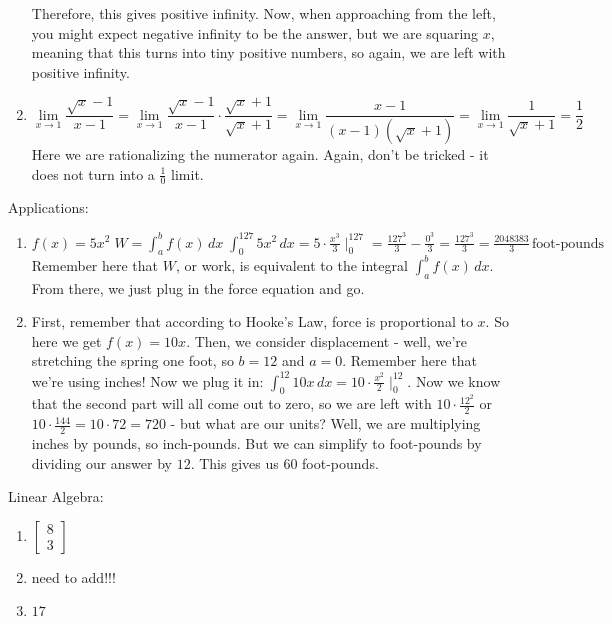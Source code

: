 \begin{enumerate}
Therefore, this gives positive infinity. 
Now, when approaching from the left, you might expect negative infinity to be the answer, but we are squaring $x$, meaning that this turns into tiny positive numbers, so again, we are left with positive infinity.
\item \begin{equation*}
    \lim\limits_{x\rightarrow 1} \frac{\sqrt{x}-1}{x-1} = \lim\limits_{x\rightarrow 1} \frac{\sqrt{x}-1}{x-1} \cdot \frac{\sqrt{x}+1}{\sqrt{x}+1} = \lim\limits_{x\rightarrow 1} \frac{x-1}{(x-1)(\sqrt{x}+1)}=\lim\limits_{x\rightarrow 1} \frac{1}{\sqrt{x}+1} = \frac{1}{2}
\end{equation*}
Here we are rationalizing the numerator again. Again, don't be tricked - it does not turn into a $\frac{1}{0}$ limit.
\end{enumerate}

Applications:
\begin{enumerate}
\item $f(x) = 5x^2 \; W = \int^b_a f(x) \, dx \; \int^127_0 5x^2 \, dx = 5\cdot \frac{x^3}{3}\mid^{127}_0 = \frac{127^3}{3}-\frac{0^3}{3} = \frac{127^3}{3} = \frac{2048383}{3} \,\text{foot-pounds}$
Remember here that $W$, or work, is equivalent to the integral $\int^b_a f(x) \, dx$. From there, we just plug in the force equation and go.
\item First, remember that according to Hooke's Law, force is proportional to $x$. 
So here we get $f(x) = 10x$. 
Then, we consider displacement - well, we're stretching the spring one foot, so $b=12$ and $a = 0$. 
Remember here that we're using inches! 
Now we plug it in: $\int^{12}_0 10x \, dx = 10\cdot\frac{x^2}{2}\mid^{12}_0$. 
Now we know that the second part will all come out to zero, so we are left with $10\cdot\frac{12^2}{2}$ or $10\cdot\frac{144}{2} = 10\cdot 72 = 720$ - but what are our units? 
Well, we are multiplying inches by pounds, so inch-pounds. 
But we can simplify to foot-pounds by dividing our answer by $12$. This gives us $60$ foot-pounds.
\end{enumerate}

Linear Algebra:
\begin{enumerate}
\item $\begin{bmatrix}8\\3\end{bmatrix}$
\item need to add!!!
\item $17$
\end{enumerate}